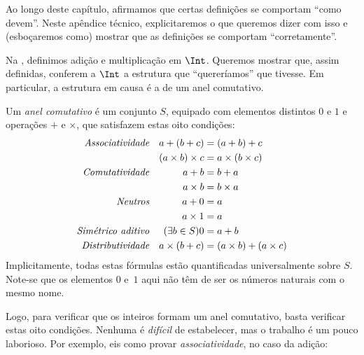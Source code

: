 \documentclass[../../../include/open-logic-section]{subfiles}
\begin{document}

Ao longo deste capítulo, afirmamos que certas definições se comportam ``como
devem''. Neste apêndice técnico, explicitaremos o que queremos dizer com isso e
(esboçaremos como) mostrar que as definições se comportam ``corretamente''.

Na , definimos adição e multiplicação em $\Int$. Queremos mostrar
que, assim definidas, conferem a $\Int$ a estrutura que ``quereríamos'' que
tivesse. Em particular, a estrutura em causa é a de um anel comutativo.

\begin{defn}
	Um \emph{anel comutativo} é um conjunto $S$, equipado com elementos
	distintos $0$ e $1$ e operações $+$ e $\times$, que satisfazem estas oito
	condições:
	\begin{align*}
		\emph{Associatividade}&&a + (b+ c) & = (a + b) + c \\
		&& (a \times b) \times c & = a \times (b\times c)\\
		\emph{Comutatividade}&&a + b &= b+ a  \\
		&&  a \times b&= b\times a\\ 
		\emph{Neutros}&&a + 0 &= a \\
		&& a \times 1 &= a\\
		\emph{Simétrico aditivo}&&(\exists b\in S)0&=a + b\\
		\emph{Distributividade}&&a \times (b+ c ) &= (a \times b) + (a \times c)
	\end{align*}
	Implicitamente, todas estas fórmulas estão quantificadas universalmente sobre
	$S$. Note-se que os elementos $0$ e~$1$ aqui não têm de ser os números naturais
	com o mesmo nome.
\end{defn}

Logo, para verificar que os inteiros formam um anel comutativo, basta verificar
estas oito condições. Nenhuma é \emph{difícil} de estabelecer, mas o trabalho é um
pouco laborioso. Por exemplo, eis como provar \emph{associatividade}, no caso da
adição:
\end{document}
